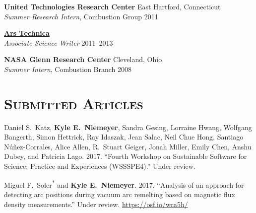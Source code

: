 \documentclass[margin,line,11pt]{res}
\makeatletter
\newlength{\bibhang}
\newlength{\bibsep}
 {\@listi \global\bibsep\itemsep \global\advance\bibsep by\parsep}
\newenvironment{bibenum*}
  {\renewcommand\labelenumi{\theenumi.}%
   \etaremune[
     topsep=0pt,
     itemsep=\bibsep,
     parsep=0pt,partopsep=0pt,
     itemindent=-\bibhang,
     leftmargin={\bibhang+\widthof{[999]}}]}
  {\endetaremune}
\makeatother
\begin{document}
\begin{resume}
\textbf{United Technologies Research Center} \hfill East Hartford, Connecticut \\
\emph{Summer Research Intern}, Combustion Group \hfill 2011

\textbf{\href{http://arstechnica.com/}{Ars Technica}} \\
\emph{Associate Science Writer} \hfill 2011--2013

\textbf{NASA Glenn Research Center} \hfill Cleveland, Ohio \\
\emph{Summer Intern}, Combustion Branch \hfill 2008

\section{\textsc{Submitted Articles}}

\begin{bibenum*}

\item Daniel S.~Katz, \textbf{Kyle E.~Niemeyer}, Sandra Gesing, Lorraine Hwang,
Wolfgang Bangerth, Simon Hettrick, Ray Idaszak, Jean Salac, Neil Chue Hong,
Santiago N\'{u}\~{n}ez-Corrales, Alice Allen, R.~Stuart Geiger, Jonah Miller, Emily Chen,
Anshu Dubey, and Patricia Lago.
2017.
``Fourth Workshop on Sustainable Software for Science: Practice and Experiences (WSSSPE4).''
Under review.

\item Miguel F.~Soler\textsuperscript{*} and \textbf{Kyle E.~Niemeyer}.
2017.
``Analysis of an approach for detecting arc positions during vacuum arc remelting based on magnetic flux density measurements.''
Under review.
\url{https://osf.io/wca5h/}


\end{bibenum*}
\end{resume}
\end{document}
